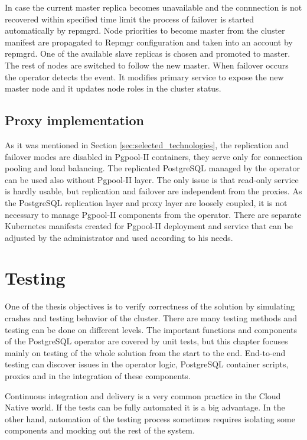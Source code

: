 \documentclass[
  digital, %
  twoside, %
  table,   %
  lof,     %
  lot,     %
]{fithesis3}
\begin{document}
In case the current master replica becomes unavailable and the connnection is not recovered within specified time limit the process of failover is started automatically by repmgrd. Node priorities to become master from the cluster manifest are propagated to Repmgr configuration and taken into an account by repmgrd. One of the available slave replicas is chosen and promoted to master. The rest of nodes are switched to follow the new master. When failover occurs the operator detects the event. It modifies primary service to expose the new master node and it updates node roles in the cluster status.

\section{Proxy implementation}
As it was mentioned in Section \ref{sec:selected_technologies}, the replication and failover modes are disabled in Pgpool-II containers, they serve only for connection pooling and load balancing. The replicated PostgreSQL managed by the operator can be used also without Pgpool-II layer. The only issue is that read-only service is hardly usable, but replication and failover are independent from the proxies. As the PostgreSQL replication layer and proxy layer are loosely coupled, it is not necessary to manage Pgpool-II components from the operator. There are separate Kubernetes manifests created for Pgpool-II deployment and service that can be adjusted by the administrator and used according to his needs.

\chapter{Testing} \label{chap:testing}
One of the thesis objectives is to verify correctness of the solution by simulating crashes and testing behavior of the cluster. There are many testing methods and testing can be done on different levels. The important functions and components of the PostgreSQL operator are covered by unit tests, but this chapter focuses mainly on testing of the whole solution from the start to the end. End-to-end testing can discover issues in the operator logic, PostgreSQL container scripts, proxies and in the integration of these components.

Continuous integration and delivery is a very common practice in the Cloud Native world. If the tests can be fully automated it is a big advantage. In the other hand, automation of the testing process sometimes requires isolating some components and mocking out the rest of the system.
\end{document}
